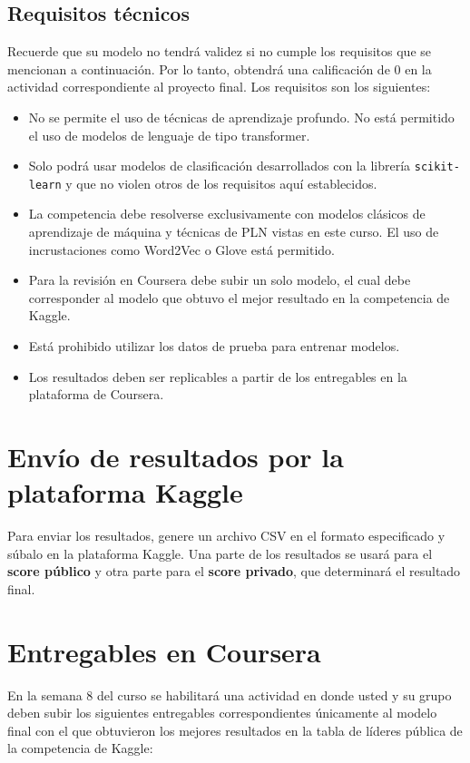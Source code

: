 \documentclass{article}
\begin{document}
\subsection{Requisitos técnicos}

Recuerde que su modelo no tendrá validez si no cumple los requisitos que se mencionan a
continuación. Por lo tanto, obtendrá una calificación de 0 en la actividad correspondiente al
proyecto final.  Los requisitos son los siguientes:

\begin{itemize}
    \item No se permite el uso de técnicas de aprendizaje profundo. No está permitido el uso de modelos de lenguaje de tipo transformer.
    \item Solo podrá usar modelos de clasificación desarrollados con la librería \texttt{scikit-learn} y que no violen otros de los requisitos aquí establecidos.
    \item La competencia debe resolverse exclusivamente con modelos clásicos de aprendizaje de máquina y técnicas de PLN vistas en este curso. El uso de incrustaciones como Word2Vec o Glove está permitido.
    \item Para la revisión en Coursera debe subir un solo modelo, el cual debe corresponder al modelo que obtuvo    el mejor resultado en la competencia de Kaggle.
    \item Está prohibido utilizar los datos de prueba para entrenar modelos.
    \item Los resultados deben ser replicables a partir de los entregables en la plataforma de Coursera.
\end{itemize}


\section{Envío de resultados por la plataforma Kaggle}
Para enviar los resultados, genere un archivo CSV en el formato especificado y súbalo en la plataforma Kaggle. Una parte de los resultados se usará para el \textbf{score público} y otra parte para el \textbf{score privado}, que determinará el resultado final.

\section{Entregables en Coursera}

En la semana 8 del curso se habilitará una actividad en donde usted y su grupo deben subir los siguientes
entregables correspondientes únicamente al modelo final con el que obtuvieron los mejores resultados en la
tabla de líderes pública de la competencia de Kaggle:
\end{document}
